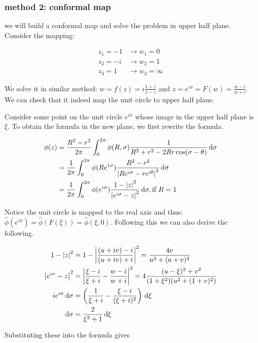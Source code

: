 \documentclass{article}
\begin{document}
\subsubsection*{method 2: conformal map}

we will build a conformal map and solve the problem in upper half plane. Consider the mapping:

\begin{align*}
    z_1=-1 &\to w_1 = 0\\
    z_2=-i &\to w_2 = 1\\
    z_3=1  &\to w_3 = \infty
\end{align*}

We solve it in similar method: \(w =f(z) = i\frac{1+z}{1-z}\) and \(z=e^{i\sigma}=F(w) =\frac{w-i}{w+i}\). We can check that it indeed map the unit circle to upper half plane.

Consider some point on the unit circle \(e^{i\sigma}\) whose image in the upper half plane is \(\xi\). To obtain the formula in the new plane, we first rewrite the formula. 

\begin{align*}
    \phi(z) &=  \frac{R^2-r^2}{2\pi} \int_0^{2\pi} \phi(R,\sigma) \frac{1}{R^2+r^2-2Rr\cos(\sigma-\theta)}\,\mathrm{d}\sigma\\
    &= \frac{1}{2\pi}  \int_0^{2\pi} \phi(Re^{1\sigma}) \frac{R^2-r^2}{\left\vert Re^{i\sigma}-re^{i\theta}\right\vert^2}\,\mathrm{d}\sigma\\
    &= \frac{1}{2\pi} \int_0^{2\pi} \phi(e^{i\sigma}) \frac{1-\left\vert z\right\vert^2}{\left\vert e^{i\sigma}-z\right\vert^2} \,\mathrm{d}\sigma, \text{if } R=1
\end{align*}

Notice the unit circle is mapped to the real axis and thus: \(\hat \phi(e^{i\sigma}) = \hat\phi(F(\xi))=\hat\phi(\xi,0)\). Following this we can also derive the following.

\begin{align*}
    1-\left\vert z\right\vert^2 &= 1-\left\vert\frac{(u+iv)-i}{(u+iv)+i}\right\vert^2 = \frac{4v}{u^2+(a+v)^2} \\
    \left\vert e^{i\sigma}-z\right\vert^2 &= \left\vert\frac{\xi-i}{\xi+i}-\frac{w-i}{w+i}\right\vert^2 = 4\frac{(u-\xi)^2+v^2}{(1+\xi^2)(u^2+(1+v)^2)}\\
    ie^{i\sigma}\,\mathrm{d}\sigma &= \left( \frac{1}{\xi+i}-\frac{\xi-i}{(\xi+i)^2} \right)\,\mathrm{d}\xi\\
    \,\mathrm{d}\sigma &= \frac{2}{\xi^2+1} \,\mathrm{d}\xi
\end{align*}

Substituting these into the formula gives
\end{document}
